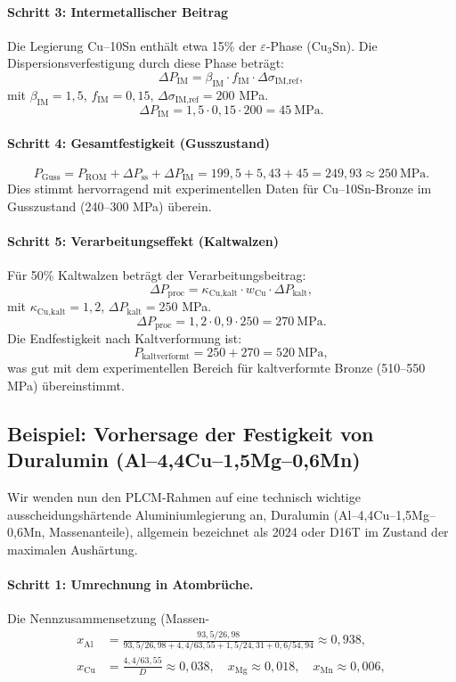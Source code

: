 \documentclass[12pt,a4paper]{article}
\begin{document}
\paragraph{Schritt 3: Intermetallischer Beitrag}
Die Legierung Cu–10Sn enthält etwa 15\% der \(\varepsilon\)-Phase (Cu\(_3\)Sn). Die Dispersionsverfestigung durch diese Phase beträgt:
\[
\Delta P_{\text{IM}} = \beta_{\text{IM}} \cdot f_{\text{IM}} \cdot \Delta \sigma_{\text{IM,ref}},
\]
mit \(\beta_{\text{IM}} = 1,5\), \(f_{\text{IM}} = 0,15\), \(\Delta \sigma_{\text{IM,ref}} = 200\) MPa.
\[
\Delta P_{\text{IM}} = 1,5 \cdot 0,15 \cdot 200 = 45\ \text{MPa}.
\]

\paragraph{Schritt 4: Gesamtfestigkeit (Gusszustand)}
\[
P_{\text{Guss}} = P_{\text{ROM}} + \Delta P_{\text{ss}} + \Delta P_{\text{IM}} = 199,5 + 5,43 + 45 = 249,93 \approx 250\ \text{MPa}.
\]
Dies stimmt hervorragend mit experimentellen Daten für Cu–10Sn-Bronze im Gusszustand (240–300 MPa) überein.

\paragraph{Schritt 5: Verarbeitungseffekt (Kaltwalzen)}
Für 50\% Kaltwalzen beträgt der Verarbeitungsbeitrag:
\[
\Delta P_{\text{proc}} = \kappa_{\text{Cu,kalt}} \cdot w_{\text{Cu}} \cdot \Delta P_{\text{kalt}},
\]
mit \(\kappa_{\text{Cu,kalt}} = 1,2\), \(\Delta P_{\text{kalt}} = 250\) MPa.
\[
\Delta P_{\text{proc}} = 1,2 \cdot 0,9 \cdot 250 = 270\ \text{MPa}.
\]
Die Endfestigkeit nach Kaltverformung ist:
\[
P_{\text{kaltverformt}} = 250 + 270 = 520\ \text{MPa},
\]
was gut mit dem experimentellen Bereich für kaltverformte Bronze (510–550 MPa) übereinstimmt.

\subsection{Beispiel: Vorhersage der Festigkeit von Duralumin (Al--4,4Cu--1,5Mg--0,6Mn)}
\label{subsec:example-duralumin}

Wir wenden nun den PLCM-Rahmen auf eine technisch wichtige ausscheidungshärtende Aluminiumlegierung an, Duralumin (Al--4,4Cu--1,5Mg--0,6Mn, Massenanteile), allgemein bezeichnet als 2024 oder D16T im Zustand der maximalen Aushärtung.

\paragraph{Schritt 1: Umrechnung in Atombrüche.}
Die Nennzusammensetzung (Massen-%
\[
\begin{aligned}
	x_{\mathrm{Al}} &= \frac{93,5/26,98}{93,5/26,98+4,4/63,55+1,5/24,31+0,6/54,94} \approx 0,938,\\
	x_{\mathrm{Cu}} &= \frac{4,4/63,55}{D} \approx 0,038,\quad
	x_{\mathrm{Mg}} \approx 0,018,\quad
	x_{\mathrm{Mn}} \approx 0,006,
\end{aligned}
\]
\end{document}
